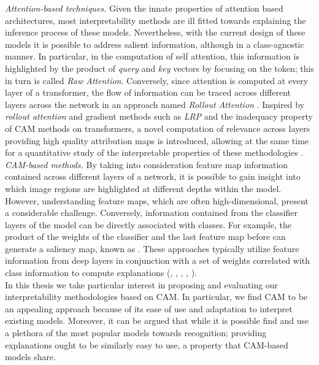 \noindent \emph{Attention-based techniques.} Given the innate properties of attention based 
architectures, most interpretability methods are ill fitted towards explaining the inference 
process of these models. Nevertheless, with the current design of these models it is possible to 
address salient information, although in a class-agnostic manner. In particular, in the computation 
of self attention, this information is highlighted by the product of \emph{query} and \emph{key} 
vectors by focusing on the \Th{[CLS]} token; this in turn is called \emph{Raw Attention}. 
Conversely, since attention is computed at every layer of a transformer, the flow of information 
can be traced across different layers across the network in an approach named \emph{Rollout 
Attention} \autocite{abnar2020quantifying}. Inspired by \emph{rollout attention} and gradient 
methods such as \emph{LRP} \autocite{bach2015pixel} and the inadequacy property of CAM methods on 
transformers, a novel computation of relevance across layers providing high quality attribution 
maps is introduced, allowing at the same time for a quantitative study of the interpretable 
properties of these methodologies \autocite{chefer2021transformer}.\\

\noindent \emph{CAM-based methods.} By taking into consideration feature map information 
contained across different layers of a network, it is possible to gain insight into which image 
regions are highlighted at different depths within the model. However, understanding feature maps, 
which are often high-dimensional, present a considerable challenge. Conversely, information 
contained from the classifier layers of the model can be directly associated with classes. For 
example, the product of the weights of the classifier and the last feature map before \gap 
can generate a saliency map, known as  \autocite{zhou2016learning}. These approaches 
typically utilize feature information from deep layers in conjunction with a set of weights 
correlated with class information to compute explanations (\cite{selvaraju2017grad}, 
\cite{chattopadhay2018grad}, \cite{wang2020score}, \cite{axiombased}, \cite{ablationcam}
\cite{jiang2021layercam}).\\

In this thesis we take particular interest in proposing and evaluating our interpretability 
methodologies based on CAM. In particular, we find CAM to be an appealing approach because of 
its ease of use and adaptation to interpret existing models. Moreover, it can be argued that while 
it is possible find and use a plethora of the most popular models towards recognition; providing 
explanations ought to be similarly easy to use, a property that CAM-based models share.\\

